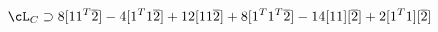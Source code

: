 \begin{equation}
\cL_C \supset 8 [1 1^T{\overline 2}] - 4 [1^T
1{\overline 2}] + 12 [1 1{\overline 2}] + 8 [1^T
1^T{\overline 2}] - 14 [11] [{\overline 2}] + 2 [1^T 1]
[{\overline 2}] \nonumber
\end{equation} 
